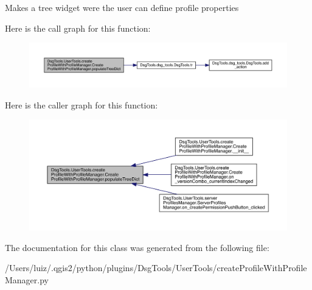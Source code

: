 \begin{DoxyVerb}Makes a tree widget were the user can define profile properties
\end{DoxyVerb}
 Here is the call graph for this function\+:
\nopagebreak
\begin{figure}[H]
\begin{center}
\leavevmode
\includegraphics[width=350pt]{class_dsg_tools_1_1_user_tools_1_1create_profile_with_profile_manager_1_1_create_profile_with_profile_manager_a0c8dfcd248faa5e16477b0e78776bedf_cgraph}
\end{center}
\end{figure}
Here is the caller graph for this function\+:
\nopagebreak
\begin{figure}[H]
\begin{center}
\leavevmode
\includegraphics[width=350pt]{class_dsg_tools_1_1_user_tools_1_1create_profile_with_profile_manager_1_1_create_profile_with_profile_manager_a0c8dfcd248faa5e16477b0e78776bedf_icgraph}
\end{center}
\end{figure}


The documentation for this class was generated from the following file\+:\begin{DoxyCompactItemize}
\item 
/\+Users/luiz/.\+qgis2/python/plugins/\+Dsg\+Tools/\+User\+Tools/create\+Profile\+With\+Profile\+Manager.\+py\end{DoxyCompactItemize}
